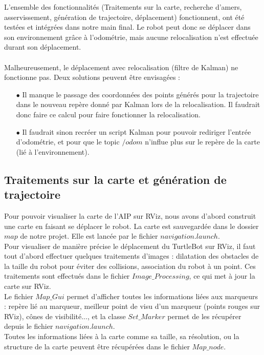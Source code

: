 \documentclass[10pt,a4paper]{article}
\begin{document}
L'ensemble des fonctionnalités (Traitements sur la carte, recherche d'amers, asservissement, génération de trajectoire, déplacement) fonctionnent, ont été testées et intégrées dans notre main final. Le robot peut donc se déplacer dans son environnement grâce à l'odométrie, mais aucune relocalisation n'est effectuée durant son déplacement.\\\\
Malheureusement, le déplacement avec relocalisation (filtre de Kalman) ne fonctionne pas. Deux solutions peuvent être envisagées :
\begin{itemize}
\item[$\bullet$]
	Il manque le passage des coordonnées des points générés pour la trajectoire dans le nouveau repère donné par Kalman lors de la relocalisation. Il faudrait donc faire ce calcul pour faire fonctionner la relocalisation.
\item[$\bullet$]
	Il faudrait sinon recréer un script Kalman pour pouvoir rediriger l'entrée d'odométrie, et pour que le topic $/odom$ n'influe plus sur le repère de la carte (lié à l'environnement).
\end{itemize}


\subsection{Traitements sur la carte et génération de trajectoire}
\label{sec:traitements}

Pour pouvoir visualiser la carte de l'AIP sur RViz, nous avons d'abord construit une carte en faisant se déplacer le robot. La carte est sauvegardée dans le dossier $map$ de notre projet. Elle est lancée par le fichier $navigation.launch$.\\

Pour visualiser de manière précise le déplacement du TurtleBot sur RViz, il faut tout d'abord effectuer quelques traitements d'images : dilatation des obstacles de la taille du robot pour éviter des collisions, association du robot à un point. Ces traitements sont effectués dans le fichier $Image\_Processing$, ce qui met à jour la carte sur RViz.\\

Le fichier $Map\_Gui$ permet d'afficher toutes les informations liées aux marqueurs : repère lié au marqueur, meilleur point de visu d'un marqueur (points rouges sur RViz), cônes de visibilité..., et la classe $Set\_Marker$ permet de les récupérer depuis le fichier $navigation.launch$.\\
Toutes les informations liées à la carte comme sa taille, sa résolution, ou la structure de la carte peuvent être récupérées dans le fichier $Map\_node$.\\\\
\end{document}
